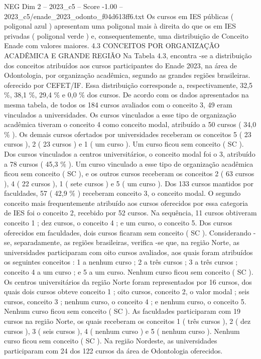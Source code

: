 \begin{textsample}{NEG Dim 2 – 2023\_c5 – Score -1.00 – 2023\_c5/enade\_2023\_odonto\_f04d613ff6.txt}
Os cursos em IES públicas ( poligonal azul ) apresentam uma poligonal mais à direita do que os em IES privadas ( poligonal verde ) e, consequentemente, uma distribuição de Conceito Enade com valores maiores. 4.3 CONCEITOS POR ORGANIZAÇÃO ACADÊMICA E GRANDE REGIÃO Na Tabela 4.3, encontra -se a distribuição dos conceitos atribuídos aos cursos participantes do Enade 2023, na área de Odontologia, por organização acadêmica, segundo as grandes regiões brasileiras. oferecido por CEFET/IF.
Essa distribuição corresponde a, respectivamente, 32,5 \%, 38,1 \%, 29,4 \% e 0,0 \% dos cursos.
De acordo com os dados apresentados na mesma tabela, de todos os 184 cursos avaliados com o conceito 3, 49 eram vinculados a universidades.
Os cursos vinculados a esse tipo de organização acadêmica tiveram o conceito 4 como conceito modal, atribuído a 50 cursos ( 34,0 \% ).
Os demais cursos ofertados por universidades receberam os conceitos 5 ( 23 cursos ), 2 ( 23 cursos ) e 1 ( um curso ).
Um curso ficou sem conceito ( SC ).
Dos cursos vinculados a centros universitários, o conceito modal foi o 3, atribuído a 78 cursos ( 45,3 \% ).
Um curso vinculado a esse tipo de organização acadêmica ficou sem conceito ( SC ), e os outros cursos receberam os conceitos 2 ( 63 cursos ), 4 ( 22 cursos ), 1 ( sete cursos ) e 5 ( um curso ).
Dos 133 cursos mantidos por faculdades, 57 ( 42,9 \% ) receberam conceito 3, o conceito modal.
O segundo conceito mais frequentemente atribuído aos cursos oferecidos por essa categoria de IES foi o conceito 2, recebido por 52 cursos.
Na sequência, 11 cursos obtiveram conceito 1 ; dez cursos, o conceito 4 ; e um curso, o conceito 5.
Dos cursos oferecidos em faculdades, dois cursos ficaram sem conceito ( SC ).
Considerando -se, separadamente, as regiões brasileiras, verifica -se que, na região Norte, as universidades participaram com oito cursos avaliados, aos quais foram atribuídos os seguintes conceitos : 1 a nenhum curso ; 2 a três cursos ; 3 a três cursos ; conceito 4 a um curso ; e 5 a um curso.
Nenhum curso ficou sem conceito ( SC ).
Os centros universitários da região Norte foram representados por 16 cursos, dos quais dois cursos obteve conceito 1 ; oito cursos, conceito 2, o valor modal ; seis cursos, conceito 3 ; nenhum curso, o conceito 4 ; e nenhum curso, o conceito 5.
Nenhum curso ficou sem conceito ( SC ).
As faculdades participaram com 19 cursos na região Norte, os quais receberam os conceitos 1 ( três cursos ), 2 ( dez cursos ), 3 ( seis cursos ), 4 ( nenhum curso ) e 5 ( nenhum curso ).
Nenhum curso ficou sem conceito ( SC ).
Na região Nordeste, as universidades participaram com 24 dos 122 cursos da área de Odontologia oferecidos.

\end{textsample}
